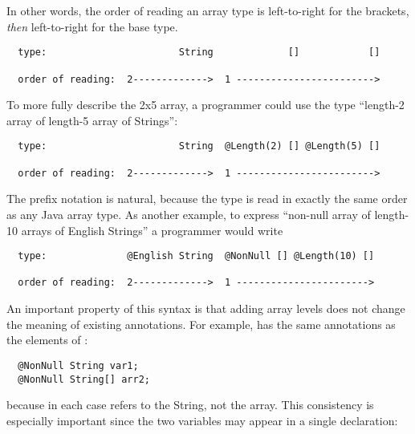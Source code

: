 \documentclass[10pt]{article}
\begin{document}
In other words, the order of reading an array type is left-to-right for the
brackets, \emph{then} left-to-right for the base type.

\begin{Verbatim}
  type:                       String             []            []

  order of reading:  2------------->  1 ------------------------>
\end{Verbatim}



To more fully describe the 2x5 array, a programmer could use the
type ``length-2 array of length-5 array of Strings'':

\begin{Verbatim}
  type:                       String  @Length(2) [] @Length(5) []

  order of reading:  2------------->  1 ------------------------>
\end{Verbatim}

The prefix notation is natural, because the type is read in exactly
the same order as any Java array type.  As another example, to express
``non-null array of length-10 arrays of English Strings'' a programmer
would write

\begin{Verbatim}
  type:              @English String  @NonNull [] @Length(10) []

  order of reading:  2------------->  1 ----------------------->
\end{Verbatim}




An important property of this syntax is that adding array levels does not
change the meaning of existing annotations.  For example,  has
the same annotations as the elements of :

\begin{Verbatim}
  @NonNull String var1;
  @NonNull String[] arr2;
\end{Verbatim}

\noindent
because in each case  refers to the String, not the array.
This consistency is especially important since the two variables may appear in a single
declaration:
\end{document}
